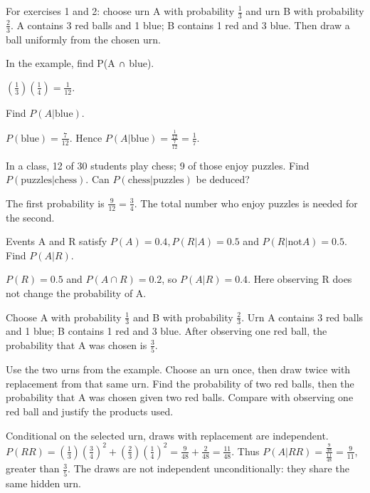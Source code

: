 \documentclass[11pt]{article}
\begin{document}
For exercises 1 and 2: choose urn A with probability \(\frac{1}{3}\) and urn B with probability \(\frac{2}{3}\). A contains 3 red balls and 1 blue; B contains 1 red and 3 blue. Then draw a ball uniformly from the chosen urn.\par
{}
In the example, find P(A ∩ blue).\par
\((\frac{1}{3})(\frac{1}{4}) = \frac{1}{12}\).\par
{}
Find \(P(A|\mathrm{blue})\).\par
\(P(\mathrm{blue}) = \frac{7}{12}\). Hence \(P(A|\mathrm{blue}) = \frac{\frac{1}{12}}{\frac{7}{12}} = \frac{1}{7}\).\par
{}
In a class, 12 of 30 students play chess; 9 of those enjoy puzzles. Find \(P(\mathrm{puzzles}|\mathrm{chess})\). Can \(P(\mathrm{chess}|\mathrm{puzzles})\) be deduced?\par
The first probability is \(\frac{9}{12} = \frac{3}{4}\). The total number who enjoy puzzles is needed for the second.\par
{}
Events A and R satisfy \(P(A)=0.4, P(R|A)=0.5\) and \(P(R|\mathrm{not} A)=0.5\). Find \(P(A|R)\).\par
\(P(R)=0.5\) and \(P(A \cap  R)=0.2\), so \(P(A|R)=0.4\). Here observing R does not change the probability of A.\par
{}
Choose A with probability \(\frac{1}{3}\) and B with probability \(\frac{2}{3}\). Urn A contains 3 red balls and 1 blue; B contains 1 red and 3 blue. After observing one red ball, the probability that A was chosen is \(\frac{3}{5}\).\par
Use the two urns from the example. Choose an urn once, then draw twice with replacement from that same urn. Find the probability of two red balls, then the probability that A was chosen given two red balls. Compare with observing one red ball and justify the products used.\par
Conditional on the selected urn, draws with replacement are independent. \(P(RR) = (\frac{1}{3})(\frac{3}{4})^{2} + (\frac{2}{3})(\frac{1}{4})^{2} = \frac{9}{48} + \frac{2}{48} = \frac{11}{48}\). Thus \(P(A|RR) = \frac{\frac{9}{48}}{\frac{11}{48}} = \frac{9}{11}\), greater than \(\frac{3}{5}\). The draws are not independent unconditionally: they share the same hidden urn.\par
\end{document}
